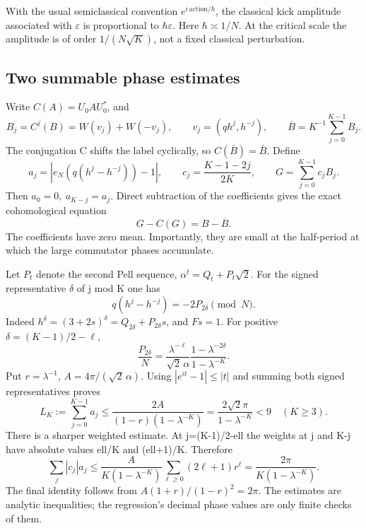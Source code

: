 With the usual semiclassical convention \(e^{i\,\mathrm{action}/\hbar}\), the classical kick amplitude associated with \(\varepsilon\) is proportional to \(\hbar\varepsilon\). Here \(\hbar\asymp1/N\). At the critical scale the amplitude is of order \(1/(N\sqrt K)\), not a fixed classical perturbation.

\subsection{Two summable phase estimates}\label{floquet:two-summable-phase-estimates}

Write \(C(A)=U_0 A U_0^*\), and \[
 B_j=C^j(B)=W(v_j)+W(-v_j),\qquad v_j=(qh^j,h^{-j}),
 \qquad \overline B=K^{-1}\sum_{j=0}^{K-1}B_j.                    \tag{FN.2}
\] The conjugation C shifts the label cyclically, so \(C(\bar B)=\bar B\). Define \[
 a_j=\left|e_N(q(h^j-h^{-j}))-1\right|,\qquad
 c_j=\frac{K-1-2j}{2K},\qquad G=\sum_{j=0}^{K-1}c_jB_j.          \tag{FN.3}
\] Then \(a_0=0,\ a_{K-j}=a_j\). Direct subtraction of the coefficients gives the exact cohomological equation \[
 G-C(G)=B-\overline B.                                         \tag{FN.4}
\] The coefficients have zero mean. Importantly, they are small at the half-period at which the large commutator phases accumulate.

Let \(P_{t}\) denote the second Pell sequence, \(\alpha^t=Q_t+P_t\sqrt2\). For the signed representative \(\delta\) of j mod K one has \[
 q(h^j-h^{-j})=-2P_{2\delta}\pmod N.                            \tag{FN.5}
\] Indeed \(h^\delta=(3+2s)^\delta=Q_{2\delta}+P_{2\delta}s\), and \(Fs=1\). For positive \(\delta=(K-1)/2-\ell\), \[
 \frac{P_{2\delta}}{N}
 =\frac{\lambda^{-\ell}}{\sqrt2\,\alpha}
       \frac{1-\lambda^{-2\delta}}{1-\lambda^{-K}}.              \tag{FN.6}
\] Put \(r=\lambda^{-1}\), \(A=4\pi/(\sqrt2\,\alpha)\). Using \(|e^{it}-1|\leq|t|\) and summing both signed representatives proves \[
 L_K:=\sum_{j=0}^{K-1}a_j
 \leq\frac{2A}{(1-r)(1-\lambda^{-K})}
 =\frac{2\sqrt2\pi}{1-\lambda^{-K}}<9\quad(K\geq3).              \tag{FN.7}
\] There is a sharper weighted estimate. At j=(K-1)/2-ell the weights at j and K-j have absolute values ell/K and (ell+1)/K. Therefore \[
 \sum_j |c_j|a_j
 \leq\frac{A}{K(1-\lambda^{-K})}\sum_{\ell\geq0}(2\ell+1)r^\ell
 =\frac{2\pi}{K(1-\lambda^{-K})}.                              \tag{FN.8}
\] The final identity follows from \(A(1+r)/(1-r)^2=2\pi\). The estimates are analytic inequalities; the regression's decimal phase values are only finite checks of them.

